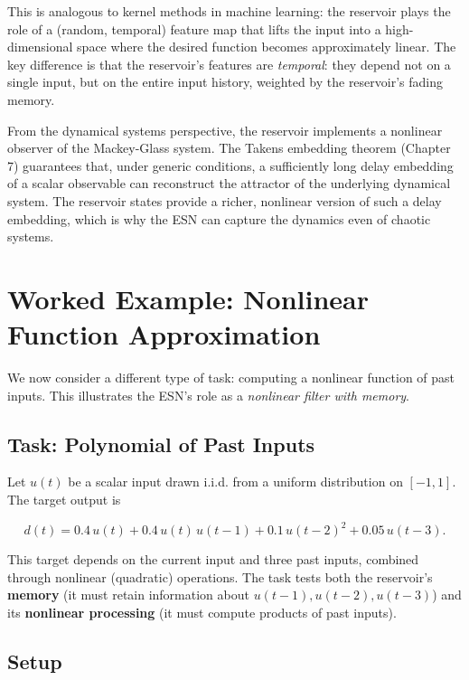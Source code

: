 This is analogous to kernel methods in machine learning: the reservoir plays the role of a (random, temporal) feature map that lifts the input into a high-dimensional space where the desired function becomes approximately linear. The key difference is that the reservoir's features are \textit{temporal}: they depend not on a single input, but on the entire input history, weighted by the reservoir's fading memory.

From the dynamical systems perspective, the reservoir implements a nonlinear observer of the Mackey-Glass system. The Takens embedding theorem (Chapter 7) guarantees that, under generic conditions, a sufficiently long delay embedding of a scalar observable can reconstruct the attractor of the underlying dynamical system. The reservoir states provide a richer, nonlinear version of such a delay embedding, which is why the ESN can capture the dynamics even of chaotic systems.


\bigskip


\section{Worked Example: Nonlinear Function Approximation}\label{sec:14.7}

We now consider a different type of task: computing a nonlinear function of past inputs. This illustrates the ESN's role as a \textit{nonlinear filter with memory}.

\subsection{Task: Polynomial of Past Inputs}\label{sec:14.7.1}

Let $u(t)$ be a scalar input drawn i.i.d. from a uniform distribution on $[-1, 1]$. The target output is

\begin{equation}\label{eq:14.13}\tag{14.13}
d(t) = 0.4\, u(t) + 0.4\, u(t)\, u(t-1) + 0.1\, u(t-2)^2 + 0.05\, u(t-3).
\end{equation}

This target depends on the current input and three past inputs, combined through nonlinear (quadratic) operations. The task tests both the reservoir's \textbf{memory} (it must retain information about $u(t-1), u(t-2), u(t-3)$) and its \textbf{nonlinear processing} (it must compute products of past inputs).

\subsection{Setup}\label{sec:14.7.2}


